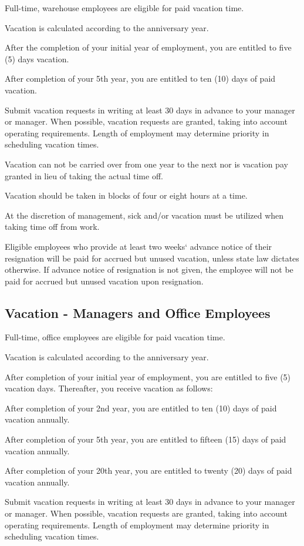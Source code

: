 Full-time, warehouse employees are eligible for paid vacation time.

Vacation is calculated according to the anniversary year.

After the completion of your initial year of employment, you are entitled to five (5) days vacation.

After completion of your 5th year, you are entitled to ten (10) days of paid vacation.

Submit vacation requests in writing at least 30 days in advance to your manager or manager. When possible, vacation requests are granted, taking into account operating requirements. Length of employment may determine priority in scheduling vacation times.

Vacation can not be carried over from one year to the next nor is vacation pay granted in lieu of taking the actual time off.

Vacation should be taken in blocks of four or eight hours at a time.

At the discretion of management, sick and/or vacation must be utilized when taking time off from work.

Eligible employees who provide at least two weeks‘ advance notice of their resignation will be paid for accrued but unused vacation, unless state law dictates otherwise. If advance notice of resignation is not given, the employee will not be paid for accrued but unused vacation upon resignation.

\subsection{Vacation - Managers and Office Employees}

Full-time, office employees are eligible for paid vacation time.

Vacation is calculated according to the anniversary year.

After completion of your initial year of employment, you are entitled to five (5) vacation days. Thereafter, you receive vacation as follows:

After completion of your 2nd year, you are entitled to ten (10) days of paid vacation annually.

After completion of your 5th year, you are entitled to fifteen (15) days of paid vacation annually.

After completion of your 20th year, you are entitled to twenty (20) days of paid vacation annually.

Submit vacation requests in writing at least 30 days in advance to your manager or manager. When possible, vacation requests are granted, taking into account operating requirements. Length of employment may determine priority in scheduling vacation times.

